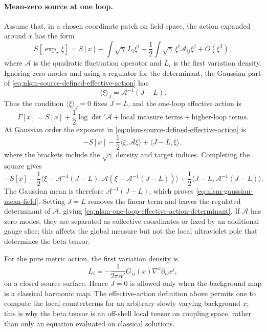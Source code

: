 \paragraph{Mean-zero source at one loop.}
Assume that, in a chosen coordinate patch on field space, the action
expanded around \(x\) has the form
\begin{equation}
  S[\exp_x\xi]
  =
  S[x]
  +
  \int\sqrt\gamma\,L_i\xi^i
  +
  \frac12
  \int\sqrt\gamma\,\xi^i\mathcal A_{ij}\xi^j
  +
  O(\xi^3),
  \label{eq:nlsm-gaussian-background-expansion}
\end{equation}
where \(\mathcal A\) is the quadratic fluctuation operator and \(L_i\) is
the first variation density.  Ignoring zero modes and using a regulator for
the determinant, the Gaussian part of
\eqref{eq:nlsm-source-defined-effective-action} has
\begin{equation}
  \langle\xi\rangle_J
  =
  \mathcal A^{-1}(J-L).
  \label{eq:nlsm-gaussian-mean-field}
\end{equation}
Thus the condition \(\langle\xi\rangle_J=0\) fixes \(J=L\), and the one-loop
effective action is
\begin{equation}
  \Gamma[x]
  =
  S[x]+\frac12\log\det{}'\mathcal A
  +
  \text{local measure terms}
  +
  \text{higher-loop terms}.
  \label{eq:nlsm-one-loop-effective-action-determinant}
\end{equation}
At Gaussian order the exponent in
\eqref{eq:nlsm-source-defined-effective-action} is
\[
  -S[x]
  -\frac12\langle\xi,\mathcal A\xi\rangle
  +
  \langle J-L,\xi\rangle,
\]
where the brackets include the \(\sqrt\gamma\) density and target indices.
Completing the square gives
\[
  -S[x]
  -\frac12\langle \xi-\mathcal A^{-1}(J-L),
    \mathcal A(\xi-\mathcal A^{-1}(J-L))\rangle
  +
  \frac12\langle J-L,\mathcal A^{-1}(J-L)\rangle .
\]
The Gaussian mean is therefore
\(\mathcal A^{-1}(J-L)\), which proves
\eqref{eq:nlsm-gaussian-mean-field}.  Setting \(J=L\) removes the linear
term and leaves the regulated determinant of \(\mathcal A\), giving
\eqref{eq:nlsm-one-loop-effective-action-determinant}.  If \(\mathcal A\)
has zero modes, they are separated as collective coordinates or fixed by an
additional gauge slice; this affects the global measure but not the local
ultraviolet pole that determines the beta tensor.

For the pure metric action, the first variation density is
\begin{equation}
  L_i
  =
  -\frac1{2\pi\alpha'}
  G_{ij}(x)\nabla^a\partial_ax^j,
  \label{eq:nlsm-pure-metric-first-variation-density}
\end{equation}
on a closed source surface.  Hence \(J=0\) is allowed only when the background map
is a classical harmonic map.  The effective-action definition above permits
one to compute the local counterterms for an arbitrary slowly varying
background \(x\); this is why the beta tensor is an off-shell local tensor on
coupling space, rather than only an equation evaluated on classical
solutions.

